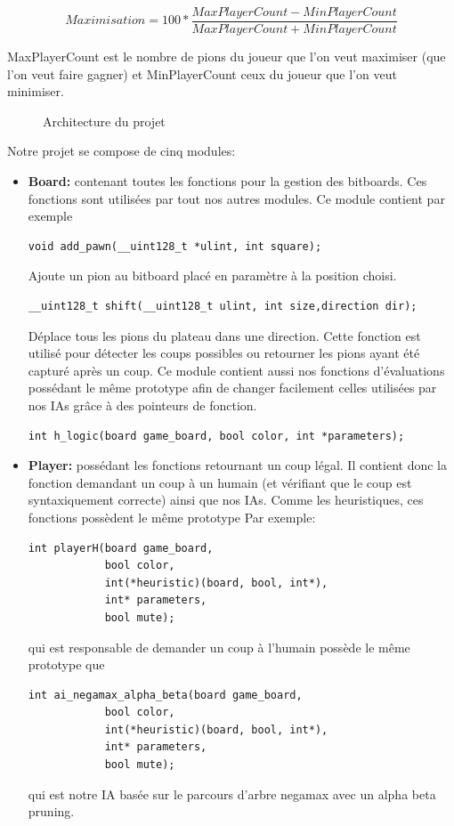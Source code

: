 \documentclass[12pt]{article}
\begin{document}
\[Maximisation = 100 * \frac{MaxPlayerCount - MinPlayerCount}{MaxPlayerCount + MinPlayerCount}\]

MaxPlayerCount est le nombre de pions du joueur que l'on veut maximiser (que l'on veut faire gagner) et MinPlayerCount ceux du joueur que l'on veut minimiser.

\begin{figure}[H]

\centering
\caption{Architecture du projet}
\end{figure}


Notre projet se compose de cinq modules:
\begin{itemize}
\item \textbf{Board:} contenant toutes les fonctions pour la gestion des bitboards. Ces fonctions sont utilisées par tout nos autres modules. Ce module contient par exemple
\begin{verbatim}
void add_pawn(__uint128_t *ulint, int square);
\end{verbatim}
Ajoute un pion au bitboard placé en paramètre à la position choisi. 
\begin{verbatim}
__uint128_t shift(__uint128_t ulint, int size,direction dir);
\end{verbatim}
Déplace tous les pions du plateau dans une direction. Cette fonction est utilisé pour détecter les coups possibles ou retourner les pions ayant été capturé après un coup. Ce module contient aussi nos fonctions d'évaluations possédant le même prototype afin de changer facilement celles utilisées par nos IAs grâce à des pointeurs de fonction.
\begin{verbatim}
int h_logic(board game_board, bool color, int *parameters);
\end{verbatim}

\item \textbf{Player:} possédant les fonctions retournant un coup légal. Il contient donc la fonction demandant un coup à un humain (et vérifiant que le coup est syntaxiquement correcte) ainsi que nos IAs. Comme les heuristiques, ces fonctions possèdent le même prototype  Par exemple:
\begin{verbatim}
int playerH(board game_board, 
            bool color, 
            int(*heuristic)(board, bool, int*),
            int* parameters,
            bool mute);
\end{verbatim}
qui est responsable de demander un coup à l'humain possède le même prototype que
\begin{verbatim}
int ai_negamax_alpha_beta(board game_board,
            bool color, 
            int(*heuristic)(board, bool, int*), 
            int* parameters, 
            bool mute);
\end{verbatim}
qui est notre IA basée sur le parcours d'arbre negamax avec un alpha beta pruning.


\end{itemize}
\end{document}
